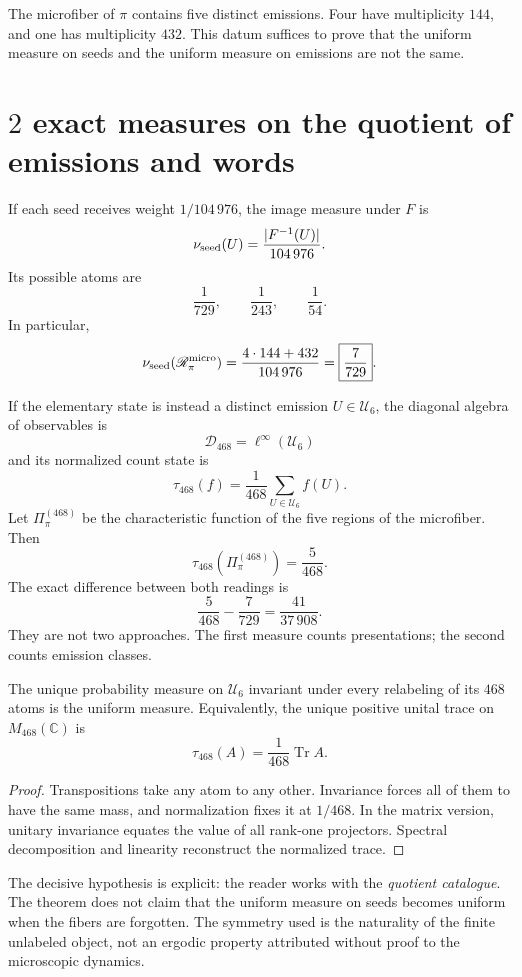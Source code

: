 The microfiber of \(\pi\) contains five distinct emissions. Four have
multiplicity \(144\), and one has multiplicity \(432\). This datum suffices
to prove that the uniform measure on seeds and the uniform measure
on emissions are not the same.

\section{\(2\) exact measures on the quotient of emissions and words}

If each seed receives weight \(1/104\,976\), the image measure under \(F\) is
\[
 \nu_{\rm seed}(U)
 =\frac{|F^{-1}(U)|}{104\,976}.
\]
Its possible atoms are
\[
 \frac1{729},\qquad\frac1{243},\qquad\frac1{54}.
\]
In particular,
\[
 \nu_{\rm seed}(\mathscr R_\pi^{\rm micro})
 =\frac{4\cdot144+432}{104\,976}
 =\boxed{\frac7{729}}.
\]

If the elementary state is instead a distinct emission
\(U\in\mathcal U_6\), the diagonal algebra of observables is
\[
 \mathcal D_{468}=\ell^\infty(\mathcal U_6)
\]
and its normalized count state is
\[
 \tau_{468}(f)
 =\frac1{468}\sum_{U\in\mathcal U_6}f(U).
\]
Let \(\Pi_\pi^{(468)}\) be the characteristic function of the five regions of the
microfiber. Then
\[
 \boxed{\tau_{468}(\Pi_\pi^{(468)})=\frac5{468}.}
\]
The exact difference between both readings is
\[
 \frac5{468}-\frac7{729}
 =\frac{41}{37\,908}.
\]
They are not two approaches. The first measure counts presentations; the second counts emission classes.

\begin{theorem}
\label{p3-20260826:thm:unicidad-medida-468}
The unique probability measure on \(\mathcal U_6\) invariant under every
relabeling of its \(468\) atoms is the uniform measure. Equivalently,
the unique positive unital trace on \(M_{468}(\mathbb C)\) is
\[
 \tau_{468}(A)=\frac1{468}\operatorname{Tr}A.
\]
\end{theorem}

\begin{proof}
Transpositions take any atom to any other. Invariance
forces all of them to have the same mass, and normalization fixes it at
\(1/468\). In the matrix version, unitary invariance equates the value
of all rank-one projectors. Spectral decomposition and
linearity reconstruct the normalized trace.
\end{proof}

The decisive hypothesis is explicit: the reader works with the
\emph{quotient catalogue}. The theorem does not claim that the uniform measure on
seeds becomes uniform when the fibers are forgotten. The symmetry used
is the naturality of the finite unlabeled object, not an ergodic property
attributed without proof to the microscopic dynamics.

